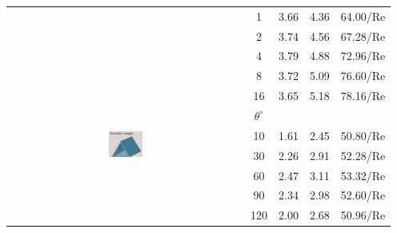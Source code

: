 \begin{table}[H]
\begin{tabular}{ccccc}
        & 1 & 3.66 & 4.36 & 64.00/Re \\
        & 2 & 3.74 & 4.56 & 67.28/Re \\
        & 4 & 3.79 & 4.88 & 72.96/Re \\
        & 8 & 3.72 & 5.09 & 76.60/Re \\
        & 16 & 3.65 & 5.18 & 78.16/Re \\
        \hline
        & \underline{$\theta^\circ$} & & & \\
        \multirow{2}{*}{\includegraphics[width=0.15\textwidth]{Figures/Sec8 Triangle Fully Laminar.png}}
        & 10 & 1.61 & 2.45 & 50.80/Re \\
        & 30 & 2.26 & 2.91 & 52.28/Re \\
        & 60 & 2.47 & 3.11 & 53.32/Re \\
        & 90 & 2.34 & 2.98 & 52.60/Re \\
        & 120 & 2.00 & 2.68 & 50.96/Re \\
        \hline
    \end{tabular}
\end{table}